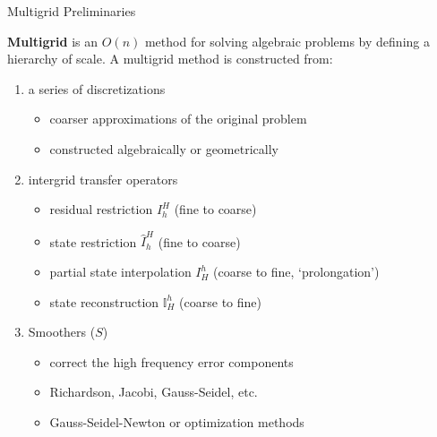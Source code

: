 \documentclass{beamer}
\begin{document}
\begin{frame}[fragile]{Multigrid Preliminaries}
\begin{figure}
    \label{fig:levels}
  \end{figure}
  \textbf{Multigrid} is an $O(n)$ method for solving algebraic problems by defining a hierarchy of scale.
  A multigrid method is constructed from:
  \begin{enumerate}
  \item a series of discretizations
    \begin{itemize}
    \item coarser approximations of the original problem
    \item constructed algebraically or geometrically
    \end{itemize}
  \item intergrid transfer operators
    \begin{itemize}
    \item residual restriction $I_h^H$ (fine to coarse)
    \item state restriction $\hat I_h^H$ (fine to coarse)
    \item partial state interpolation $I_H^h$ (coarse to fine, `prolongation')
    \item state reconstruction $\mathbb{I}_H^h$ (coarse to fine)
    \end{itemize}
  \item Smoothers ($S$)
    \begin{itemize}
    \item correct the high frequency error components
    \item Richardson, Jacobi, Gauss-Seidel, etc.
    \item Gauss-Seidel-Newton or optimization methods
    \end{itemize}
  \end{enumerate}
\end{frame}

\end{document}
